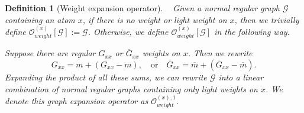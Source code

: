 \documentclass{article}
\newcommand{\1}{\mathds{1}}
\numberwithin{equation}{section}
\renewcommand{\cal}{\mathcal}
\theoremstyle{plain} %
\newtheorem{definition}[theorem]{Definition}
\theoremstyle{remark}
\newcommand{\cob}{\color{purple}}
\newcommand{\nc}{\normalcolor}
\begin{document}
\begin{definition} [Weight expansion operator]\label{Ow-def} \ %
	Given a normal regular graph $\cal G$ containing an atom $x$, if there is no weight or light weight on $x$, then %
	we trivially define $\cal O_{weight}^{(x)}[\cal G]:=\cal G$. Otherwise,  we define ${\cal O}_{weight}^{(x)}[\cal G]$ in the following way. 
	
	\medskip
	
	 Suppose there are regular $G_{xx}$ or $\overline G_{xx}$ weights on $x$. Then we rewrite %
	$$G_{xx}=m+ (G_{xx}-m),\quad \text{or}\quad \overline G_{xx}=\overline m+ (\overline G_{xx}-\overline m).$$
	Expanding the product of all these sums, we can rewrite $\cal G$ into a linear combination of normal regular graphs containing only light weights on $x$. We denote this graph expansion operator as $ {\cal O}^{(x), 1}_{weight}$.  
	
	\medskip
	

\end{definition}
\end{document}

